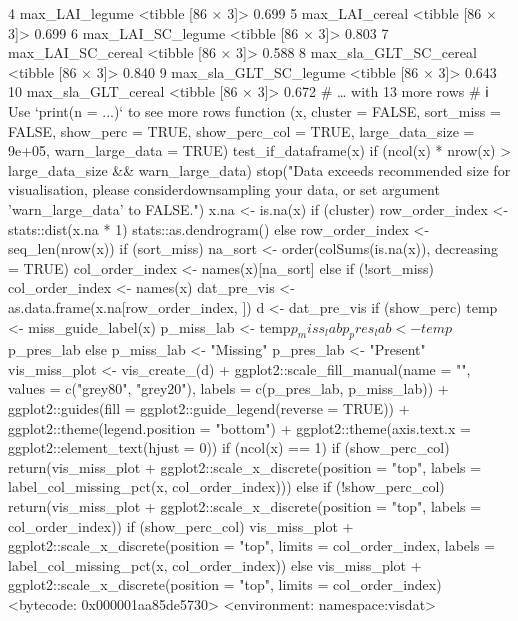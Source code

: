  4 max_LAI_legume                           <tibble [86 × 3]> 0.699
 5 max_LAI_cereal                           <tibble [86 × 3]> 0.699
 6 max_LAI_SC_legume                        <tibble [86 × 3]> 0.803
 7 max_LAI_SC_cereal                        <tibble [86 × 3]> 0.588
 8 max_sla_GLT_SC_cereal                    <tibble [86 × 3]> 0.840
 9 max_sla_GLT_SC_legume                    <tibble [86 × 3]> 0.643
10 max_sla_GLT_cereal                       <tibble [86 × 3]> 0.672
# … with 13 more rows
# ℹ Use `print(n = ...)` to see more rows
function (x, cluster = FALSE, sort_miss = FALSE, show_perc = TRUE, 
    show_perc_col = TRUE, large_data_size = 9e+05, warn_large_data = TRUE) 
{
    test_if_dataframe(x)
    if (ncol(x) * nrow(x) > large_data_size && warn_large_data) {
        stop("Data exceeds recommended size for visualisation, please consider\n         downsampling your data, or set argument 'warn_large_data' to FALSE.")
    }
    x.na <- is.na(x)
    if (cluster) {
        row_order_index <- stats::dist(x.na * 1) %
            stats::as.dendrogram() %
    }
    else {
        row_order_index <- seq_len(nrow(x))
    }
    if (sort_miss) {
        na_sort <- order(colSums(is.na(x)), decreasing = TRUE)
        col_order_index <- names(x)[na_sort]
    }
    else if (!sort_miss) {
        col_order_index <- names(x)
    }
    dat_pre_vis <- as.data.frame(x.na[row_order_index, ])
    d <- dat_pre_vis %
    if (show_perc) {
        temp <- miss_guide_label(x)
        p_miss_lab <- temp$p_miss_lab
        p_pres_lab <- temp$p_pres_lab
    }
    else {
        p_miss_lab <- "Missing"
        p_pres_lab <- "Present"
    }
    vis_miss_plot <- vis_create_(d) + ggplot2::scale_fill_manual(name = "", 
        values = c("grey80", "grey20"), labels = c(p_pres_lab, 
            p_miss_lab)) + ggplot2::guides(fill = ggplot2::guide_legend(reverse = TRUE)) + 
        ggplot2::theme(legend.position = "bottom") + ggplot2::theme(axis.text.x = ggplot2::element_text(hjust = 0))
    if (ncol(x) == 1) {
        if (show_perc_col) {
            return(vis_miss_plot + ggplot2::scale_x_discrete(position = "top", 
                labels = label_col_missing_pct(x, col_order_index)))
        }
        else if (!show_perc_col) {
            return(vis_miss_plot + ggplot2::scale_x_discrete(position = "top", 
                labels = col_order_index))
        }
    }
    if (show_perc_col) {
        vis_miss_plot + ggplot2::scale_x_discrete(position = "top", 
            limits = col_order_index, labels = label_col_missing_pct(x, 
                col_order_index))
    }
    else {
        vis_miss_plot + ggplot2::scale_x_discrete(position = "top", 
            limits = col_order_index)
    }
}
<bytecode: 0x000001aa85de5730>
<environment: namespace:visdat>

